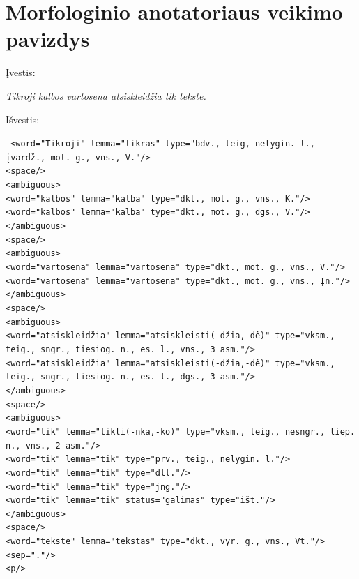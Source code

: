 \documentclass{VUMIFInfBakalaurinis}
\begin{document}
\appendix  %

\section{Morfologinio anotatoriaus veikimo pavizdys}\label{morfAnot}

\noindent Įvestis:

\noindent \textit{Tikroji kalbos vartosena atsiskleidžia tik tekste.}

\noindent Išvestis:

\scriptsize
\noindent \texttt{
<word="Tikroji" lemma="tikras" type="bdv., teig, nelygin. l., įvardž., mot. g., vns., V."/>\\
<space/>\\
<ambiguous>\\
<word="kalbos" lemma="kalba" type="dkt., mot. g., vns., K."/>\\
<word="kalbos" lemma="kalba" type="dkt., mot. g., dgs., V."/>\\
</ambiguous>\\
<space/>\\
<ambiguous>\\
<word="vartosena" lemma="vartosena" type="dkt., mot. g., vns., V."/>\\
<word="vartosena" lemma="vartosena" type="dkt., mot. g., vns., Įn."/>\\
</ambiguous>\\
<space/>\\
<ambiguous>\\
<word="atsiskleidžia" lemma="atsiskleisti(-džia,-dė)" type="vksm., teig., sngr., tiesiog. n., es. l., vns., 3 asm."/>\\
<word="atsiskleidžia" lemma="atsiskleisti(-džia,-dė)" type="vksm., teig., sngr., tiesiog. n., es. l., dgs., 3 asm."/>\\
</ambiguous>\\
<space/>\\
<ambiguous>\\
<word="tik" lemma="tikti(-nka,-ko)" type="vksm., teig., nesngr., liep. n., vns., 2 asm."/>\\
<word="tik" lemma="tik" type="prv., teig., nelygin. l."/>\\
<word="tik" lemma="tik" type="dll."/>\\
<word="tik" lemma="tik" type="jng."/>\\
<word="tik" lemma="tik" status="galimas" type="išt."/>\\
</ambiguous>\\
<space/>\\
<word="tekste" lemma="tekstas" type="dkt., vyr. g., vns., Vt."/>\\
<sep="."/>\\
<p/>
}
\normalsize
\end{document}
